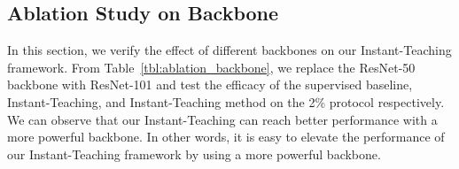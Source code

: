 \documentclass[final]{cvpr}
\begin{document}
\begin{table}[t!]
\centering
\caption{Comparison of mAP for different semi-supervised methods with different backbones on the 2\% MS-COCO protocol. The value in brackets represents the mAP improvement compared to the corresponding supervised model.}
\label{tbl:ablation_backbone}
\end{table}


\subsection{Ablation Study on Backbone}
\label{sec:backbone}
In this section, we verify the effect of different backbones on our Instant-Teaching framework. From Table~\ref{tbl:ablation_backbone}, we replace the ResNet-50 backbone with ResNet-101 and test the efficacy of the supervised baseline, Instant-Teaching, and Instant-Teaching method on the 2\% protocol respectively. We can observe that our Instant-Teaching can reach better performance with a more powerful backbone. In other words, it is easy to elevate the performance of our Instant-Teaching framework by using a more powerful backbone.
\end{document}
